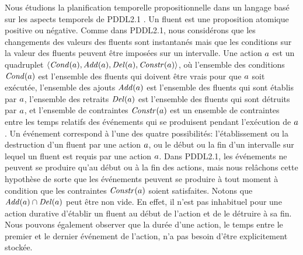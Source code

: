 Nous \'{e}tudions la planification temporelle propositionnelle dans un langage bas\'{e} sur les aspects temporels de PDDL2.1 \cite{DBLP:journals/jair/FoxL03}. Un fluent est une proposition atomique positive ou n\'{e}gative. Comme dans PDDL2.1, nous consid\'{e}rons que les changements des valeurs des fluents sont instantan\'{e}s mais que les conditions sur la valeur des fluents peuvent \^{e}tre impos\'{e}es sur un intervalle. Une action $a$ est un quadruplet $\langle\mathit{Cond}(a),\mathit{Add}(a),\mathit{Del}(a),\mathit{Constr}(a)\rangle$, o\`{u} l'ensemble des conditions $\mathit{Cond}(a)$ est l'ensemble des fluents qui doivent \^{e}tre vrais pour que $a$ soit ex\'{e}cut\'{e}e, l'ensemble des ajouts $\mathit{Add}(a)$ est l'ensemble des fluents qui sont \'{e}tablis par $a$, l'ensemble des retraits $\mathit{Del}(a)$ est l'ensemble des fluents qui sont d\'{e}truits par $a$, et l'ensemble de contraintes $\mathit{Constr}(a)$ est un ensemble de contraintes entre les temps relatifs des \'{e}v\'{e}nements qui se produisent pendant l'ex\'{e}cution de $a$. Un \'{e}v\'{e}nement correspond \`{a} l'une des quatre possibilit\'{e}s: l'\'{e}tablissement ou la destruction d'un fluent par une action $a$, ou le d\'{e}but ou la fin d'un intervalle sur lequel un fluent est requis par une action $a$. Dans PDDL2.1, les \'{e}v\'{e}nements ne peuvent se produire qu'au d\'{e}but ou \`{a} la fin des actions, mais nous rel\^{a}chons cette hypoth\`{e}se de sorte que les \'{e}v\'{e}nements peuvent se produire \`{a} tout moment \`{a} condition que les contraintes $\mathit{Constr}(a)$ soient satisfaites. Notons que $\mathit{Add}(a) \cap \mathit{Del}(a)$ peut \^{e}tre non vide. En effet, il n'est pas inhabituel pour une action durative d'\'{e}tablir un fluent au d\'{e}but de l'action et de le d\'{e}truire \`{a} sa fin. Nous pouvons \'{e}galement observer que la dur\'{e}e d'une action, le temps entre le premier et le dernier \'{e}v\'{e}nement de l'action, n'a pas besoin d'\^{e}tre explicitement stock\'{e}e.


